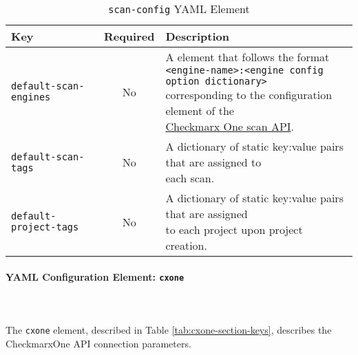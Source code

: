 \begin{table}[h]
    \caption{\texttt{scan-config} YAML Element}  
    \label{tab:scan-config-section-keys}      
    \begin{tabularx}{\textwidth}{lcl}
        \toprule
        \textbf{Key} & \textbf{Required} & \textbf{Description}\\
        \midrule
        \texttt{default-scan-engines} & No & \makecell[l]{A element that follows the format\\\texttt{<engine-name>:<engine config option dictionary>}\\corresponding to the configuration element of the\\\href{https://checkmarx.stoplight.io/docs/checkmarx-one-api-reference-guide/branches/main/f601dd9456e80-run-a-scan}{Checkmarx One scan API}.}\\
        \midrule
        \texttt{default-scan-tags} & No &  \makecell[l]{A dictionary of static key:value pairs that are assigned to\\each scan.}\\
        \midrule
        \texttt{default-project-tags} & No & \makecell[l]{A dictionary of static key:value pairs that are assigned\\to each project upon project creation.}\\
        \bottomrule
    \end{tabularx}
\end{table}


\paragraph{YAML Configuration Element: \texttt{cxone} }\label{sec:cxone-element}

\noindent\\\\The \texttt{cxone} element, described in Table \ref{tab:cxone-section-keys}, 
describes the CheckmarxOne API connection parameters.


